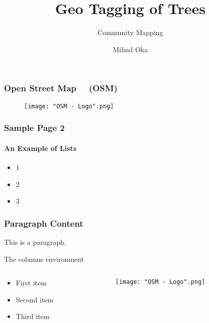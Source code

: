 \documentclass[17pt]{beamer}
\title{Geo Tagging of Trees}
\subtitle{Community Mapping}
\author{Milind Oka}
\begin{document}
	\frame 
	{
		\titlepage
	}
	
	
	\frame 
	{
		\frametitle{Open Street Map \ \  (OSM) }
		\begin{figure}
    
    \texttt{[image: "OSM - Logo".png]}
\end{figure}	
		}
	
	
	\frame
	{
		
		\frametitle{Sample Page 2}
		\framesubtitle{An Example of Lists}
		\begin{itemize}
			\item 1
			\item 2
			\item 3
		\end{itemize}
		
	}
	
	\begin{frame}
	    \frametitle{Paragraph Content}
	    This is a paragraph.
	 \end{frame}
	 
	 
	 \begin{frame}{The columns environment}
\begin{columns}
    \begin{column}{0.47\textwidth}
        \begin{itemize}
            \item First item
            \item Second item
            \item Third item
        \end{itemize}
    \end{column}
    \begin{column}{0.5\textwidth}
              \texttt{[image: "OSM - Logo".png]}  
    \end{column}
\end{columns}
\end{frame}
	 
	 
\end{document}
